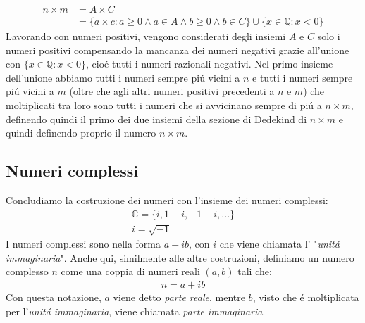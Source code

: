 \documentclass[twoside]{article} %
\begin{document}
	\begin{align*}
		 n\times m&=A\times C\\
		 		  &=\{a\times c:a\geq 0\wedge a\in A\wedge b\geq 0\wedge b\in C\}\cup \{x\in \mathbb{Q}:x<0\}
	\end{align*}
	Lavorando con numeri positivi, vengono considerati degli insiemi $A$ e $C$ solo i numeri positivi compensando la mancanza dei numeri negativi grazie all'unione con $\{x\in \mathbb{Q}:x<0\}$, cio\'e tutti i numeri razionali negativi. Nel primo insieme dell'unione abbiamo tutti i numeri sempre pi\'u vicini a $n$ e tutti i numeri sempre pi\'u vicini a $m$ (oltre che agli altri numeri positivi precedenti a $n$ e $m$) che moltiplicati tra loro sono tutti i numeri che si avvicinano sempre di pi\'u a $n\times m$, definendo quindi il primo dei due insiemi della sezione di Dedekind di $n\times m$ e quindi definendo proprio il numero $n\times m$.
	\newpage
	\subsection{Numeri complessi}
	Concludiamo la costruzione dei numeri con l'insieme dei numeri complessi:
	\begin{gather*}
	 	\mathbb{C}=\{i,1+i, -1-i, ...\}\\
	 	i=\sqrt{-1}
	 \end{gather*}
	 I numeri complessi sono nella forma $a+ib$, con $i$ che viene chiamata l' "\textit{unit\'a immaginaria}". Anche qui, similmente alle altre costruzioni, definiamo un numero complesso $n$ come una coppia di numeri reali $(a,b)$ tali che:
	 \begin{gather*}
	 	n=a+ib
	 \end{gather*}
	 Con questa notazione, $a$ viene detto \textit{parte reale}, mentre $b$, visto che \'e moltiplicata per l'\textit{unit\'a immaginaria}, viene chiamata \textit{parte immaginaria}.
\end{document}
